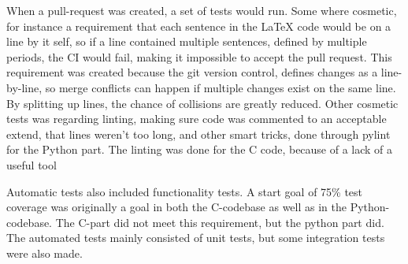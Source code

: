 When a pull-request was created, a set of tests would run.
Some where cosmetic, for instance a requirement that each sentence in the LaTeX code would be on a line by it self, so if a line contained multiple sentences, defined by multiple periods, the CI would fail, making it impossible to accept the pull request.
This requirement was created because the git version control, defines changes as a line-by-line, so merge conflicts can happen if multiple changes exist on the same line.
By splitting up lines, the chance of collisions are greatly reduced.
Other cosmetic tests was regarding linting, making sure code was commented to an acceptable extend, that lines weren't too long, and other smart tricks, done through pylint for the Python part.
The linting was done for the C code, because of a lack of a useful tool


Automatic tests also included functionality tests.
A start goal of 75\% test coverage was originally a goal in both the C-codebase as well as in the Python-codebase. 
The C-part did not meet this requirement, but the python part did.
The automated tests mainly consisted of unit tests, but some integration tests were also made.



